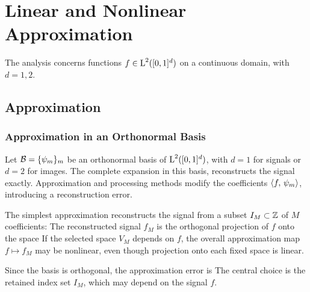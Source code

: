 
\chapter{Linear and Nonlinear Approximation}
\label{chap-approx}\label{chap-approximation}


The analysis concerns functions $f \in \text{\upshape L}^2([0,1]^d)$ on a continuous domain, with $d=1,2$.


\section{Approximation}

\subsection{Approximation in an Orthonormal Basis}

Let $\mathcal{B} = \{ \psi_m \}_m$ be an orthonormal basis of $\text{\upshape L}^2([0,1]^d)$, with $d=1$ for signals or $d=2$ for images.
The complete expansion in this basis,
reconstructs the signal exactly. Approximation and processing methods modify the coefficients $\langle f,\,\psi_m\rangle$, introducing a reconstruction error.

The simplest approximation reconstructs the signal from a subset $I_M \subset \mathbb{Z}$ of $M$ coefficients:
The reconstructed signal $f_M$ is the orthogonal projection of $f$ onto the space
If the selected space $V_M$ depends on $f$, the overall approximation map $f \mapsto f_M$ may be nonlinear, even though projection onto each fixed space is linear.

Since the basis is orthogonal, the approximation error is 
The central choice is the retained index set $I_M$, which may depend on the signal $f$.

